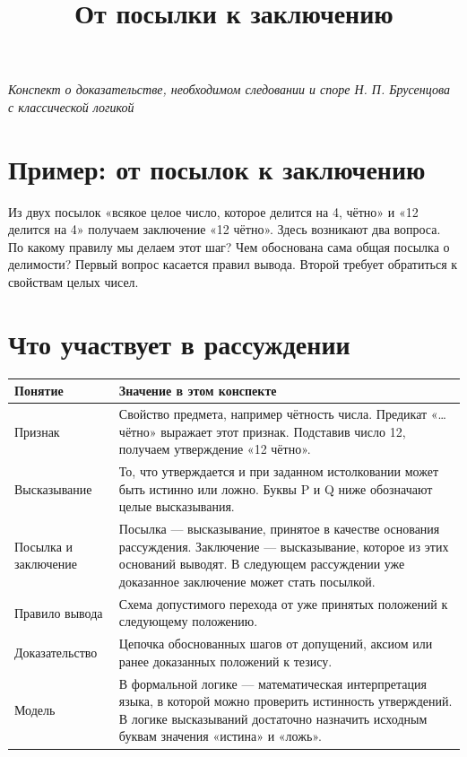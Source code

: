 \documentclass[12pt,a4paper]{article}
\title{От посылки к заключению}
\author{}
\date{}
\begin{document}
\maketitle
\begin{center}\emph{Конспект о доказательстве, необходимом следовании и споре Н. П. Брусенцова с классической логикой}\end{center}

\section{Пример: от посылок к заключению}

Из двух посылок «всякое целое число, которое делится на 4, чётно» и «12 делится на 4» получаем заключение «12 чётно». Здесь возникают два вопроса. По какому правилу мы делаем этот шаг? Чем обоснована сама общая посылка о делимости? Первый вопрос касается правил вывода. Второй требует обратиться к свойствам целых чисел.

\section{Что участвует в рассуждении}

\begin{longtable}{P{.23\linewidth}P{.70\linewidth}}
\toprule
\textbf{Понятие} & \textbf{Значение в этом конспекте} \\
\midrule
Признак & Свойство предмета, например чётность числа. Предикат «… чётно» выражает этот признак. Подставив число 12, получаем утверждение «12 чётно». \\
Высказывание & То, что утверждается и при заданном истолковании может быть истинно или ложно. Буквы P и Q ниже обозначают целые высказывания. \\
Посылка и заключение & Посылка — высказывание, принятое в качестве основания рассуждения. Заключение — высказывание, которое из этих оснований выводят. В следующем рассуждении уже доказанное заключение может стать посылкой. \\
Правило вывода & Схема допустимого перехода от уже принятых положений к следующему положению. \\
Доказательство & Цепочка обоснованных шагов от допущений, аксиом или ранее доказанных положений к тезису. \\
Модель & В формальной логике — математическая интерпретация языка, в которой можно проверить истинность утверждений. В логике высказываний достаточно назначить исходным буквам значения «истина» и «ложь». \\
\bottomrule
\end{longtable}
\end{document}
